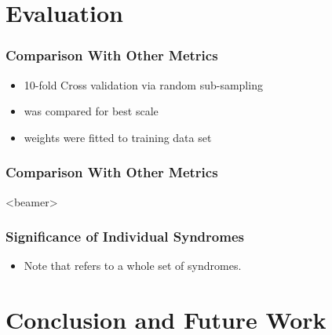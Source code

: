 \documentclass{beamer}
\providecommand*{\BonusSlide}{beamer}
\begin{document}
\section{Evaluation}

\begin{frame}
  \frametitle{Comparison With Other Metrics}
  \par\vfill
  \begin{itemize}
  \item 10-fold Cross validation via random sub-sampling
  \item {} was compared for best scale
  \item {} weights were fitted to training data set
  \end{itemize}
\end{frame}

\begin{frame}
  \frametitle{Comparison With Other Metrics}
  \ShowDemo{}
\end{frame}

\begin{frame}<\BonusSlide>
  \frametitle{Significance of Individual Syndromes}
  \begin{center}
  \end{center}
  \par\vfill
  \begin{itemize}
  \item Note that  refers to a whole set of syndromes.
  \end{itemize}
\end{frame}

\section{Conclusion and Future Work}
\end{document}
